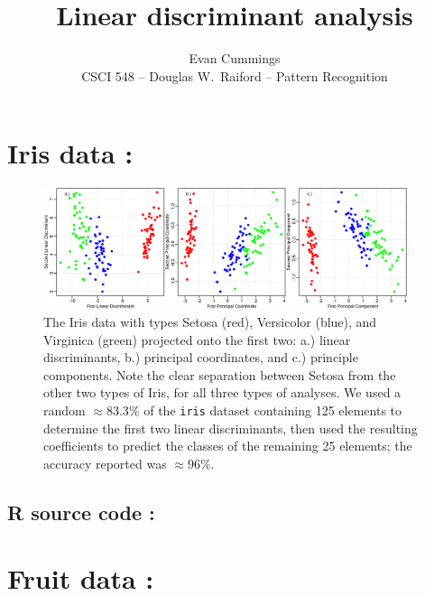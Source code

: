 



\title{Linear discriminant analysis}
\author{Evan Cummings\\
CSCI 548 -- Douglas W.~Raiford -- Pattern Recognition}

\maketitle

\section{Iris data :}


\begin{figure}[H]
  \centering
    \includegraphics[width=0.95\textwidth]{images/iris.png}
  \caption{The Iris data with types Setosa (red), Versicolor (blue), and Virginica (green) projected onto the first two: a.) linear discriminants, b.) principal coordinates, and c.) principle components.  Note the clear separation between Setosa from the other two types of Iris, for all three types of analyses.  We used a random $\approx 83.3\%$ of the \texttt{iris} dataset containing 125 elements to determine the first two linear discriminants, then used the resulting coefficients to predict the classes of the remaining 25 elements; the accuracy reported was $\approx 96\%$.}
\end{figure}

\subsection{R source code :}

\begin{multicols}{2}


\end{multicols}

\section{Fruit data :}

